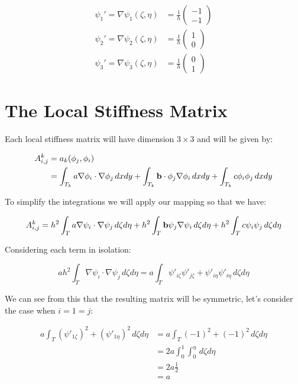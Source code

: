 \begin{align}\label{eq:master_basis_functions_derivative}
    \psi_1' = \nabla\psi_1(\zeta, \eta) &=
        \frac{1}{h}\left(\begin{array}{c}-1 \\ -1\end{array}\right) \\
    \psi_2' = \nabla\psi_2(\zeta, \eta) &=
        \frac{1}{h}\left(\begin{array}{c}1 \\ 0\end{array}\right) \\
    \psi_3' = \nabla\psi_3(\zeta, \eta) &=
        \frac{1}{h}\left(\begin{array}{c}0 \\ 1\end{array}\right)
\end{align}

\section{The Local Stiffness Matrix}

Each local stiffness matrix will have dimension $3 \times 3$ and will be given
by:

\begin{align*}
    A^k_{i,j} &= a_k(\phi_j, \phi_i) \\
     &= \int_{T_k}a\nabla\phi_i\cdot\nabla\phi_j\,dxdy +
        \int_{T_k}\mathbf{b}\cdot\phi_j\nabla\phi_i\,dxdy +
        \int_{T_k}c\phi_i\phi_j\,dxdy
\end{align*}

To simplify the integrations we will apply our mapping so that we have:

\[
    A^k_{i,j} = h^2\int_Ta\nabla\psi_i\cdot\nabla\psi_j\,d\zeta d\eta +
                h^2\int_T\mathbf{b}\psi_j\nabla\psi_i\,d\zeta d\eta +
                h^2\int_Tc\psi_i\psi_j\,d\zeta d\eta
\]

Considering each term in isolation:

\[
    ah^2\int_T\nabla\psi_i\cdot\nabla\psi_j\,d\zeta d\eta =
    a\int_T\psi'_{i\zeta}\psi'_{j\zeta} +
        \psi'_{i\eta}\psi'_{i\eta}\,d\zeta d\eta
\]

We can see from this that the resulting matrix will be symmetric, let's
consider the case when $i = 1 = j$:

\begin{align*}
    a\int_T(\psi'_{1\zeta})^2 + (\psi'_{1\eta})^2\,d\zeta d\eta & =
        a\int_T(-1)^2 + (-1)^2\,d\zeta d\eta \\
    &= 2a\int_0^1\int_0^\eta\,d\zeta d\eta \\
    &= 2a\frac{1}{2} \\
    &= a
\end{align*}

